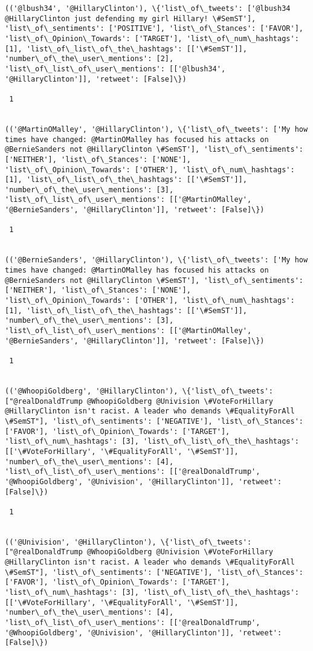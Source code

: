 \documentclass[11pt]{article}
\begin{document}
\begin{Verbatim}[commandchars=\\\{\}]
(('@lbush34', '@HillaryClinton'), \{'list\_of\_tweets': ['@lbush34 @HillaryClinton just defending my girl Hillary! \#SemST'], 'list\_of\_sentiments': ['POSITIVE'], 'list\_of\_Stances': ['FAVOR'], 'list\_of\_Opinion\_Towards': ['TARGET'], 'list\_of\_num\_hashtags': [1], 'list\_of\_list\_of\_the\_hashtags': [['\#SemST']], 'number\_of\_the\_user\_mentions': [2], 'list\_of\_list\_of\_user\_mentions': [['@lbush34', '@HillaryClinton']], 'retweet': [False]\})

 1
 

(('@MartinOMalley', '@HillaryClinton'), \{'list\_of\_tweets': ['My how times have changed: @MartinOMalley has focused his attacks on @BernieSanders not @HillaryClinton \#SemST'], 'list\_of\_sentiments': ['NEITHER'], 'list\_of\_Stances': ['NONE'], 'list\_of\_Opinion\_Towards': ['OTHER'], 'list\_of\_num\_hashtags': [1], 'list\_of\_list\_of\_the\_hashtags': [['\#SemST']], 'number\_of\_the\_user\_mentions': [3], 'list\_of\_list\_of\_user\_mentions': [['@MartinOMalley', '@BernieSanders', '@HillaryClinton']], 'retweet': [False]\})

 1
 

(('@BernieSanders', '@HillaryClinton'), \{'list\_of\_tweets': ['My how times have changed: @MartinOMalley has focused his attacks on @BernieSanders not @HillaryClinton \#SemST'], 'list\_of\_sentiments': ['NEITHER'], 'list\_of\_Stances': ['NONE'], 'list\_of\_Opinion\_Towards': ['OTHER'], 'list\_of\_num\_hashtags': [1], 'list\_of\_list\_of\_the\_hashtags': [['\#SemST']], 'number\_of\_the\_user\_mentions': [3], 'list\_of\_list\_of\_user\_mentions': [['@MartinOMalley', '@BernieSanders', '@HillaryClinton']], 'retweet': [False]\})

 1
 

(('@WhoopiGoldberg', '@HillaryClinton'), \{'list\_of\_tweets': ["@realDonaldTrump @WhoopiGoldberg @Univision \#VoteForHillary @HillaryClinton isn't racist. A leader who demands \#EqualityForAll \#SemST"], 'list\_of\_sentiments': ['NEGATIVE'], 'list\_of\_Stances': ['FAVOR'], 'list\_of\_Opinion\_Towards': ['TARGET'], 'list\_of\_num\_hashtags': [3], 'list\_of\_list\_of\_the\_hashtags': [['\#VoteForHillary', '\#EqualityForAll', '\#SemST']], 'number\_of\_the\_user\_mentions': [4], 'list\_of\_list\_of\_user\_mentions': [['@realDonaldTrump', '@WhoopiGoldberg', '@Univision', '@HillaryClinton']], 'retweet': [False]\})

 1
 

(('@Univision', '@HillaryClinton'), \{'list\_of\_tweets': ["@realDonaldTrump @WhoopiGoldberg @Univision \#VoteForHillary @HillaryClinton isn't racist. A leader who demands \#EqualityForAll \#SemST"], 'list\_of\_sentiments': ['NEGATIVE'], 'list\_of\_Stances': ['FAVOR'], 'list\_of\_Opinion\_Towards': ['TARGET'], 'list\_of\_num\_hashtags': [3], 'list\_of\_list\_of\_the\_hashtags': [['\#VoteForHillary', '\#EqualityForAll', '\#SemST']], 'number\_of\_the\_user\_mentions': [4], 'list\_of\_list\_of\_user\_mentions': [['@realDonaldTrump', '@WhoopiGoldberg', '@Univision', '@HillaryClinton']], 'retweet': [False]\})


\end{Verbatim}
\end{document}
